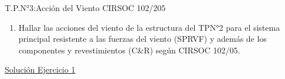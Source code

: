 \begin{center}
\Large{T.P.N°3:Acción del Viento CIRSOC 102/205}
\end{center}

\begin{enumerate}
\item Hallar las acciones del viento de la estructura del TPN°2 para el sistema principal resistente a las fuerzas del viento (SPRVF) y además de los componentes y revestimientos (C\&R) según CIRSOC 102/05.\\

\end{enumerate}

\begin{center}
\underline{\large{Solución Ejercicio 1}}
\end{center}

